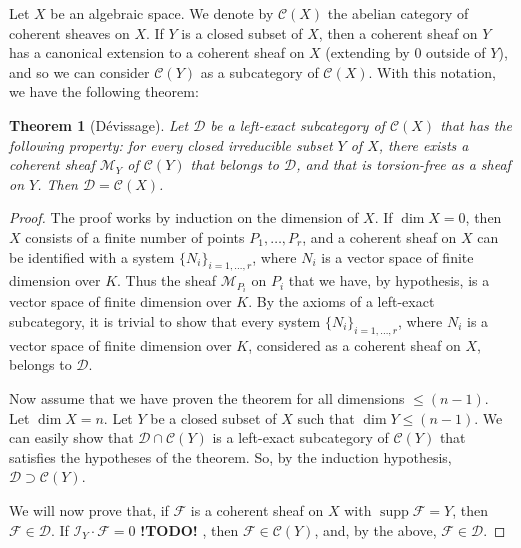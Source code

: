 \documentclass{article}
\theoremstyle{plain}
\newtheorem{theorem}{Theorem}
\theoremstyle{definition}
\newcommand{\sh}{\mathscr}
\newcommand{\cat}{\mathcal}
\renewcommand{\leq}{\leqslant}
\DeclareMathOperator{\supp}{supp}
\newcommand{\todo}{\textbf{ !TODO! }}
\newcommand{\oldpage}[1]{\marginpar{\footnotesize$\Big\vert$ \textit{p.~#1}}}
\begin{document}
Let $X$ be an algebraic space.
We denote by $\cat{C}(X)$ the abelian category of coherent sheaves on $X$.
If $Y$ is a closed subset of $X$, then a coherent sheaf on $Y$ has a canonical extension to a coherent sheaf on $X$ (extending by $0$ outside of $Y$), and so we can consider $\cat{C}(Y)$ as a subcategory of $\cat{C}(X)$.
With this notation, we have the following theorem:

\oldpage{4-04}
\begin{theorem}[D\'{e}vissage]
  Let $\cat{D}$ be a left-exact subcategory of $\cat{C}(X)$ that has the following property:
  for every closed irreducible subset $Y$ of $X$, there exists a coherent sheaf $\sh{M}_Y$ of $\cat{C}(Y)$ that belongs to $\cat{D}$, and that is torsion-free as a sheaf on $Y$.
  Then $\cat{D}=\cat{C}(X)$.
\end{theorem}

\begin{proof}
  The proof works by induction on the dimension of $X$.
  If $\dim X=0$, then $X$ consists of a finite number of points $P_1,\ldots,P_r$, and a coherent sheaf on $X$ can be identified with a system $\{N_i\}_{i=1,\ldots,r}$, where $N_i$ is a vector space of finite dimension over $K$.
  Thus the sheaf $\sh{M}_{P_i}$ on $P_i$ that we have, by hypothesis, is a vector space of finite dimension over $K$.
  By the axioms of a left-exact subcategory, it is trivial to show that every system $\{N_i\}_{i=1,\ldots,r}$, where $N_i$ is a vector space of finite dimension over $K$, considered as a coherent sheaf on $X$, belongs to $\cat{D}$.

  Now assume that we have proven the theorem for all dimensions $\leq (n-1)$.
  Let $\dim X=n$.
  Let $Y$ be a closed subset of $X$ such that $\dim Y\leq(n-1)$.
  We can easily show that $\cat{D}\cap\cat{C}(Y)$ is a left-exact subcategory of $\cat{C}(Y)$ that satisfies the hypotheses of the theorem.
  So, by the induction hypothesis, $\cat{D}\supset\cat{C}(Y)$.

  We will now prove that, if $\sh{F}$ is a coherent sheaf on $X$ with $\supp\sh{F}=Y$, then $\sh{F}\in\cat{D}$.
  If $\sh{I}_Y\cdot\sh{F}=0$ \todo, then $\sh{F}\in\cat{C}(Y)$, and, by the above, $\sh{F}\in\cat{D}$.
\end{proof}



\nocite{*}

\end{document}

